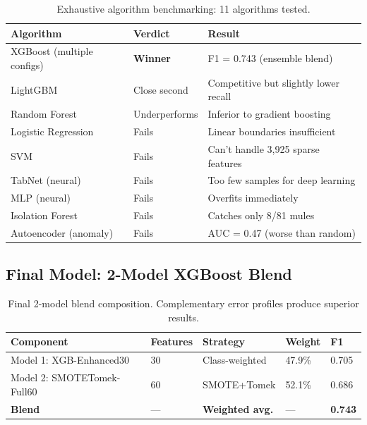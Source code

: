 \documentclass[11pt, a4paper]{article}
\begin{document}
\begin{table}[H]
\centering
\small
{}
\begin{tabularx}{\textwidth}{L{4.5cm} L{2.5cm} Y}
\toprule
{}
\textbf{Algorithm} & \textbf{Verdict} & \textbf{Result} \\
\midrule
XGBoost (multiple configs) & \textcolor{highlightgreen}{\textbf{Winner}} & F1 = 0.743 (ensemble blend) \\
LightGBM & Close second & Competitive but slightly lower recall \\
Random Forest & Underperforms & Inferior to gradient boosting \\
Logistic Regression & \textcolor{warningred}{Fails} & Linear boundaries insufficient \\
SVM & \textcolor{warningred}{Fails} & Can't handle 3,925 sparse features \\
TabNet (neural) & \textcolor{warningred}{Fails} & Too few samples for deep learning \\
MLP (neural) & \textcolor{warningred}{Fails} & Overfits immediately \\
Isolation Forest & \textcolor{warningred}{Fails} & Catches only 8/81 mules \\
Autoencoder (anomaly) & \textcolor{warningred}{Fails} & AUC = 0.47 (worse than random) \\
\bottomrule
\end{tabularx}
\caption{Exhaustive algorithm benchmarking: 11 algorithms tested.}
\end{table}

\subsection{Final Model: 2-Model XGBoost Blend}

\begin{table}[H]
\centering
\small
{}
\begin{tabularx}{\textwidth}{L{4.5cm} L{2cm} Y L{2cm} L{1.5cm}}
\toprule
{}
\textbf{Component} & \textbf{Features} & \textbf{Strategy} & \textbf{Weight} & \textbf{F1} \\
\midrule
Model 1: XGB-Enhanced30 & 30 & Class-weighted & 47.9\% & 0.705 \\
Model 2: SMOTETomek-Full60 & 60 & SMOTE+Tomek & 52.1\% & 0.686 \\
\textbf{Blend} & --- & \textbf{Weighted avg.} & --- & \textbf{0.743} \\
\bottomrule
\end{tabularx}
\caption{Final 2-model blend composition. Complementary error profiles produce superior results.}
\end{table}
\end{document}
